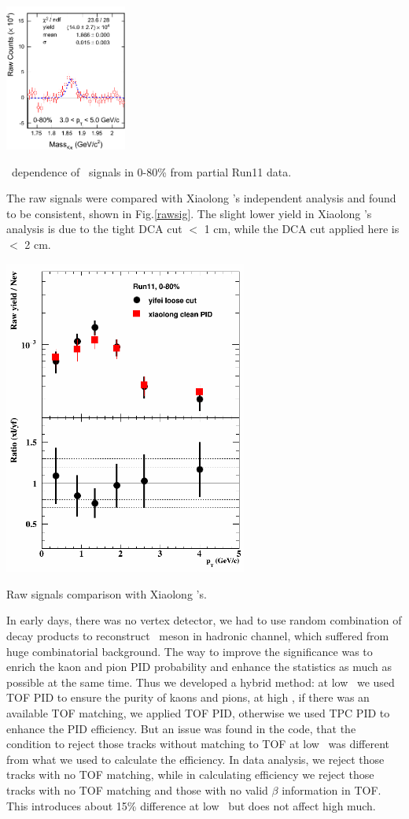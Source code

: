 \includegraphics[width=0.3\textwidth]{figure/Run11_YF/D0_0-80_31_50_signal.png}
\caption{\pt\ dependence of \dzero\ signals in 0-80\% from partial Run11 data.}
\label{D0inpt1}
\efg

The raw signals were compared with Xiaolong 's independent analysis and found to be consistent, shown in Fig.\ref{rawsig}. The slight lower yield in Xiaolong 's analysis is due to the tight DCA cut $<$ 1 cm, while the DCA cut applied here is $<$ 2 cm.

\bfg \centering
\includegraphics[width=0.6\textwidth]{figure/Run11_YF/RawY_0_80.png}
\caption{Raw signals comparison with Xiaolong 's.}
\label{rawsig}
\efg

In early days, there was no vertex detector, we had to use random combination of decay products to reconstruct \dzero\ meson in hadronic channel, which suffered from huge combinatorial background. The way to improve the significance was to enrich the kaon and pion PID probability and enhance the statistics as much as possible at the same time. Thus we developed a hybrid method: at low \pt\ we used TOF PID to ensure the purity of kaons and pions, at high \pt , if there was an available TOF matching, we applied TOF PID, otherwise we used TPC PID to enhance the PID efficiency. But an issue was found in the code, that the condition to reject those tracks without matching to TOF at low \pt\ was different from what we used to calculate the efficiency. In data analysis, we reject those tracks with no TOF matching, while in calculating efficiency we reject those tracks with no TOF matching and those with no valid $\beta$ information in TOF. This introduces about 15\% difference at low \pt\ but does not affect high \pt much. 

